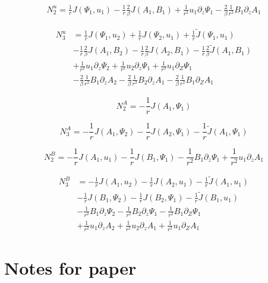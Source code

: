 \documentclass{paper}
\newcommand{\beq}{\begin{equation}}
\newcommand{\eeq}{\end{equation}}
\begin{document}
\beq
\begin{split}
N_2^{u} = \frac{1}{r} J\left(\Psi_1, u_1\right) - \frac{1}{r} \frac{2}{\beta} J\left(A_1, B_1\right) + \frac{1}{r^2} u_1 \partial_z \Psi_1 - \frac{2}{\beta}\frac{1}{r^2} B_1 \partial_z A_1
\end{split}
\eeq

\beq
\begin{split}
N_3^u & = \frac{1}{r}J\left(\Psi_1, u_2\right) + \frac{1}{r}J\left(\Psi_2, u_1\right) + \frac{1}{r}\widetilde{J} \left(\Psi_1, u_1\right) \\
& - \frac{1}{r}\frac{2}{\beta} J\left(A_1, B_2\right) - \frac{1}{r} \frac{2}{\beta} J\left(A_2, B_1\right) - \frac{1}{r}\frac{2}{\beta}\widetilde{J}\left(A_1, B_1\right) \\
& + \frac{1}{r^2} u_1\partial_z \Psi_2 + \frac{1}{r^2} u_2 \partial_z \Psi_1 + \frac{1}{r^2} u_1 \partial_Z \Psi_1 \\
& - \frac{2}{\beta} \frac{1}{r^2} B_1 \partial_z A_2 - \frac{2}{\beta} \frac{1}{r^2} B_2 \partial_z A_1 - \frac{2}{\beta} \frac{1}{r^2} B_1 \partial_Z A_1
\end{split}
\eeq

\beq
N_2^A = -\frac{1}{r} J\left(A_1, \Psi_1\right)
\eeq

\beq
N_3^A = -\frac{1}{r} J\left(A_1, \Psi_2\right) - \frac{1}{r}J\left(A_2, \Psi_1\right) - \frac{1}{r} \widetilde{J}\left(A_1, \Psi_1\right)
\eeq

\beq
N_2^B = -\frac{1}{r} J\left(A_1, u_1\right) - \frac{1}{r} J\left(B_1, \Psi_1\right) - \frac{1}{r^2} B_1 \partial_z \Psi_1 + \frac{1}{r^2} u_1 \partial_z A_1
\eeq

\beq
\begin{split}
N_3^B & = - \frac{1}{r} J\left(A_1, u_2\right) - \frac{1}{r} J\left(A_2, u_1\right) - \frac{1}{r}\widetilde{J}\left(A_1, u_1\right) \\
& - \frac{1}{r} J\left(B_1, \Psi_2\right) - \frac{1}{r} J\left(B_2, \Psi_1\right) - \frac{1}{r} \widetilde{J} \left(B_1, u_1\right) \\
& - \frac{1}{r^2} B_1\partial_z \Psi_2 - \frac{1}{r^2} B_2 \partial_z \Psi_1 - \frac{1}{r^2} B_1 \partial_Z \Psi_1 \\
& + \frac{1}{r^2} u_1 \partial_z A_2 + \frac{1}{r^2} u_2 \partial_z A_1 + \frac{1}{r^2} u_1 \partial_Z A_1
\end{split}
\eeq

\section{Notes for paper}
\end{document}
